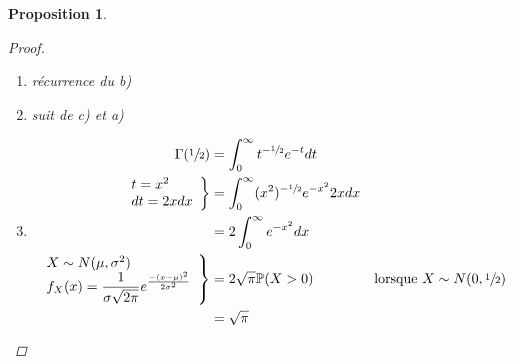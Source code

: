 \documentclass{report}
\newcommand*{\dlim}[3]{\displaystyle\lim_{#1 \to #2}#3}
\newcommand*{\dint}[3]{\displaystyle\int_{#1}^{#2}#3}
\newtheorem*{prop}{Proposition}
\theoremstyle{definition}
\theoremstyle{remark}
\begin{document}
\begin{prop}
\begin{proof}
\begin{enumerate}[label=\alph*)]
				\begin{align*}
					\Gamma(y)&= \left. -t^{y-1}e^{-t} \right|_{t=0}^\infty + (y-1) \dint{0}{\infty}{t^{y-2}e^{-t} dt}\\
					&= -\dlim{t}{\infty}{\dfrac{t^{y-1}}{e^t}} + (y-1)\Gamma(y-1)\\
					&= (y-1)\Gamma(y-1)
				\end{align*}
				\item r\'ecurrence du b)
				\item suit de c) et a)
				\item \begin{align*}
					\Gamma(\sfrac{1}{2})&= \dint{0}{\infty}{t^{-\sfrac{1}{2}}e^{-t} dt}\\
					\left.\begin{array}{l}
						t=x^2\\
						dt=2xdx
					\end{array}\right\}&= \dint{0}{\infty}{(x^2)^{-\sfrac{1}{2}}e^{-x^2} 2xdx}\\
					&= 2 \dint{0}{\infty}{e^{-x^2} dx}\\
					\left.\begin{array}{l}
						X \sim N(\mu, \sigma^2)\\
						f_X(x)=\dfrac{1}{\sigma\sqrt{2\pi}}e^{\frac{-(x-\mu)^2}{2\sigma^2}}
					\end{array}\right\}&= 2\sqrt{\pi} \mathbb{P}(X>0)&\text{lorsque } X \sim N(0, \sfrac{1}{2})\\
					&= \sqrt{\pi}
				\end{align*}
			\end{enumerate}
		\end{proof}
	\end{prop}
\end{document}
